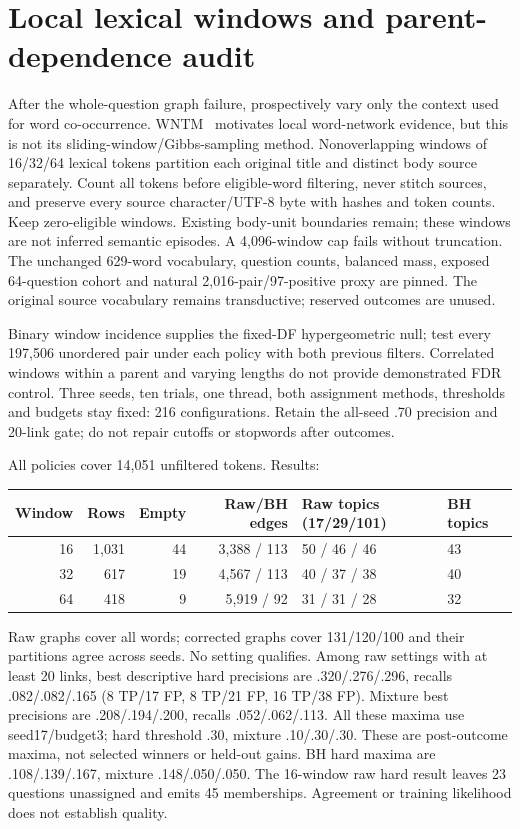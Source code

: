 \documentclass[11pt]{article}
\begin{document}
\section{Local lexical windows and parent-dependence audit}
After the whole-question graph failure, prospectively vary only the context
used for word co-occurrence. WNTM~\cite{wntm2014} motivates local word-network
evidence, but this is not its sliding-window/Gibbs-sampling method. Nonoverlapping
windows of 16/32/64 lexical tokens partition each original title and distinct
body source separately. Count all tokens before eligible-word filtering, never
stitch sources, and preserve every source character/UTF-8 byte with hashes and
token counts. Keep zero-eligible windows. Existing body-unit boundaries remain;
these windows are not inferred semantic episodes. A 4,096-window cap fails without
truncation. The unchanged 629-word vocabulary, question counts, balanced mass,
exposed 64-question cohort and natural 2,016-pair/97-positive proxy are pinned.
The original source vocabulary remains transductive; reserved outcomes are unused.

Binary window incidence supplies the fixed-DF hypergeometric null; test every
197,506 unordered pair under each policy with both previous filters. Correlated
windows within a parent and varying lengths do not provide demonstrated FDR
control. Three seeds, ten trials, one thread, both assignment methods, thresholds
and budgets stay fixed: 216 configurations. Retain the all-seed .70 precision
and 20-link gate; do not repair cutoffs or stopwords after outcomes.

All policies cover 14,051 unfiltered tokens. Results:
\begin{center}\small
\begin{tabular}{rrrrll}\toprule
Window & Rows & Empty & Raw/BH edges & Raw topics (17/29/101) & BH topics\\\midrule
16 & 1,031 & 44 & 3,388 / 113 & 50 / 46 / 46 & 43\\
32 & 617 & 19 & 4,567 / 113 & 40 / 37 / 38 & 40\\
64 & 418 & 9 & 5,919 / 92 & 31 / 31 / 28 & 32\\\bottomrule
\end{tabular}\end{center}
Raw graphs cover all words; corrected graphs cover 131/120/100 and their
partitions agree across seeds. No setting qualifies. Among raw settings with
at least 20 links, best descriptive hard precisions are .320/.276/.296, recalls
.082/.082/.165 (8 TP/17 FP, 8 TP/21 FP, 16 TP/38 FP). Mixture best precisions
are .208/.194/.200, recalls .052/.062/.113. All these maxima use seed17/budget3;
hard threshold .30, mixture .10/.30/.30. These are post-outcome maxima, not
selected winners or held-out gains. BH hard maxima are .108/.139/.167, mixture
.148/.050/.050. The 16-window raw hard result leaves 23 questions unassigned and
emits 45 memberships. Agreement or training likelihood does not establish quality.
\end{document}
